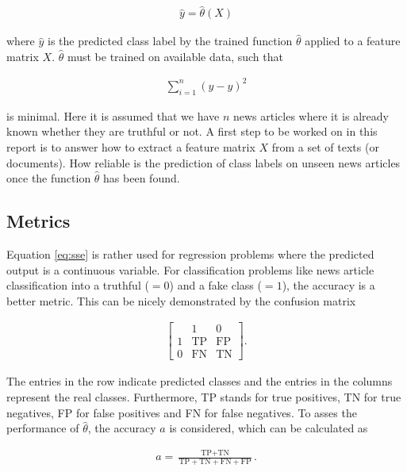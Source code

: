 \documentclass[a4paper,12pt,nottoc]{article}
\begin{document}
\begin{gather}
\hat{y} =\hat{\theta}(X)
\end{gather}

\noindent where $\hat{y}$ is the predicted class label by the trained function $\hat{\theta}$ applied to a feature matrix $X$. $\hat{\theta}$ must be trained on available data, such that

\begin{gather}\label{eq:sse}
\sum_{i=1}^{n} \left(y - \hat{y} \right)^2
\end{gather}

\noindent is minimal. Here it is assumed that we have $n$ news articles where it is already known whether they are truthful or not. A first step to be worked on in this report is to answer how to extract a feature matrix $X$ from a set of texts (or documents). How reliable is the prediction of class labels on unseen news articles once the function $\hat{\theta}$ has been found.

\subsection{Metrics}

Equation \ref{eq:sse} is rather used for regression problems where the predicted output is a continuous variable. For classification problems like news article classification into a truthful ($= 0$) and a fake class ($= 1$), the accuracy is a better metric. This can be nicely demonstrated by the confusion matrix

\begin{gather}
\begin{bmatrix}
& 1 & 0 \\
1 & \textrm{TP} & \textrm{FP} \\
0 & \textrm{FN} & \textrm{TN}
\end{bmatrix}.
\end{gather}

\noindent The entries in the row indicate predicted classes and the entries in the columns represent the real classes. Furthermore, TP stands for true positives, TN for true negatives, FP for false positives and FN for false negatives. To asses the performance of $\hat{\theta}$, the accuracy $a$ is considered, which can be calculated as

\begin{gather}\label{eq:acc}
a = \frac{\textrm{TP} + \textrm{TN}}{\textrm{TP} + \textrm{TN} + \textrm{FN} + \textrm{FP}}.
\end{gather}
\end{document}
